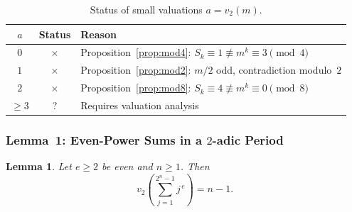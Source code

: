 \documentclass[12pt,a4paper]{article}
\theoremstyle{plain}
\newtheorem{lemma}[theorem]{Lemma}
\theoremstyle{definition}
\newcommand{\vtwo}[1]{v_{2}\!\left(#1\right)}
\begin{document}
\begin{table}[htbp]
\centering
\caption{Status of small valuations $a = v_2(m)$.}
\label{tab:small-a}
\begin{tabular}{ccl}
\toprule
$a$ & Status & Reason \\
\midrule
$0$ & $\times$ & Proposition~\ref{prop:mod4}: $S_k \equiv 1 \not\equiv m^k \equiv 3 \pmod{4}$ \\
$1$ & $\times$ & Proposition~\ref{prop:mod2}: $m/2$ odd, contradiction modulo~$2$ \\
$2$ & $\times$ & Proposition~\ref{prop:mod8}: $S_k \equiv 4 \not\equiv m^k \equiv 0 \pmod{8}$ \\
$\ge 3$ & ? & Requires valuation analysis \\
\bottomrule
\end{tabular}
\end{table}

\subsubsection{Lemma~1: Even-Power Sums in a $2$-adic Period}
\label{sec:lemma1}

\begin{lemma}\label{lem:even-power}
  Let $e \ge 2$ be even and $n \ge 1$.  Then
  \begin{equation}\label{eq:even-power-formula}
    \vtwo{\sum_{j=1}^{2^n - 1} j^{\,e}} = n - 1.
  \end{equation}
\end{lemma}
\end{document}
